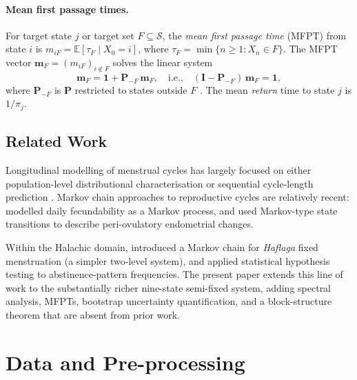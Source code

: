\documentclass[12pt,a4paper]{article}
\newcommand{\mat}[1]{\mathbf{#1}}
\newcommand{\E}{\mathbb{E}}
\newcommand{\haflaga}{\textit{Haflaga}}
\begin{document}
\paragraph{Mean first passage times.}
For target state $j$ or target set $F \subseteq \mathcal{S}$, the \emph{mean first
passage time} (MFPT) from state $i$ is
$m_{iF} = \E[\tau_F \mid X_0 = i]$, where $\tau_F = \min\{n \ge 1 : X_n \in F\}$.
The MFPT vector $\mathbf{m}_F = (m_{iF})_{i \notin F}$ solves the linear system
\begin{equation}\label{eq:mfpt}
  \mathbf{m}_F = \mathbf{1} + \mat{P}_{-F}\,\mathbf{m}_F,
  \quad\text{i.e.,}\quad
  (\mat{I} - \mat{P}_{-F})\,\mathbf{m}_F = \mathbf{1},
\end{equation}
where $\mat{P}_{-F}$ is $\mat{P}$ restricted to states outside $F$ \citep{KemenySnell1960}.
The mean \emph{return} time to state $j$ is $1/\pi_j$.

\subsection{Related Work}
\label{sec:related}

Longitudinal modelling of menstrual cycles has largely focused on either
population-level distributional characterisation
\citep{Treloar1967, Chiazze1968, Guo2006, Symul2019, Bull2019}
or sequential cycle-length prediction \citep{Liao2018}.
Markov chain approaches to reproductive cycles are relatively recent:
\citet{Colombo2000} modelled daily fecundability as a Markov process, and
\citet{Pierson2001} used Markov-type state transitions to describe
peri-ovulatory endometrial changes.

Within the Halachic domain, \citet{Ross2024markov} introduced a Markov chain
for \haflaga{} fixed menstruation (a simpler two-level system), and
\citet{Ross2023stat} applied statistical hypothesis testing to abstinence-pattern
frequencies.  The present paper extends this line of work to the
substantially richer nine-state semi-fixed system, adding spectral analysis,
MFPTs, bootstrap uncertainty quantification, and a block-structure theorem
that are absent from prior work.

\section{Data and Pre-processing}
\label{sec:data}
\end{document}
